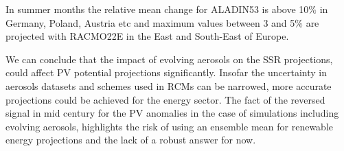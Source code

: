 In summer months the relative mean change for ALADIN53 is above 10$\%$ in Germany, Poland, Austria etc and maximum values between 3 and 5$\%$ are projected with RACMO22E in the East and South-East of Europe.  

We can conclude that the impact of evolving aerosols on the SSR projections, could affect PV potential projections significantly. Insofar the uncertainty in aerosols datasets and schemes used in RCMs can be narrowed, more accurate projections could be achieved for the energy sector. The fact of the reversed signal in mid century for the PV anomalies in the case of simulations including evolving aerosols, highlights the risk of using an ensemble mean for renewable energy projections and the lack of a robust answer for now.   


